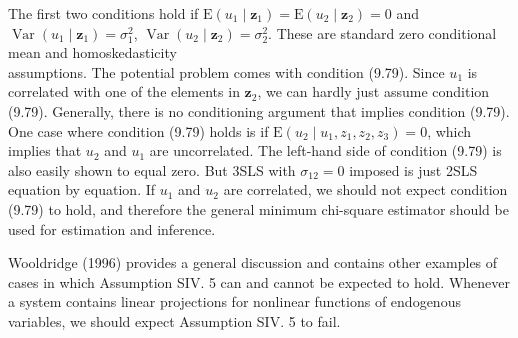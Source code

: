 \documentclass[10pt]{article}
\begin{document}
The first two conditions hold if $\mathrm{E}\left(u_{1} \mid \mathbf{z}_{1}\right)=\mathrm{E}\left(u_{2} \mid \mathbf{z}_{2}\right)=0$ and $\operatorname{Var}\left(u_{1} \mid \mathbf{z}_{1}\right)=\sigma_{1}^{2}$, $\operatorname{Var}\left(u_{2} \mid \mathbf{z}_{2}\right)=\sigma_{2}^{2}$. These are standard zero conditional mean and homoskedasticity\\
assumptions. The potential problem comes with condition (9.79). Since $u_{1}$ is correlated with one of the elements in $\mathbf{z}_{2}$, we can hardly just assume condition (9.79). Generally, there is no conditioning argument that implies condition (9.79). One case where condition (9.79) holds is if $\mathrm{E}\left(u_{2} \mid u_{1}, z_{1}, z_{2}, z_{3}\right)=0$, which implies that $u_{2}$ and $u_{1}$ are uncorrelated. The left-hand side of condition (9.79) is also easily shown to equal zero. But 3SLS with $\sigma_{12}=0$ imposed is just 2SLS equation by equation. If $u_{1}$ and $u_{2}$ are correlated, we should not expect condition (9.79) to hold, and therefore the general minimum chi-square estimator should be used for estimation and inference.

Wooldridge (1996) provides a general discussion and contains other examples of cases in which Assumption SIV. 5 can and cannot be expected to hold. Whenever a system contains linear projections for nonlinear functions of endogenous variables, we should expect Assumption SIV. 5 to fail.
\end{document}

